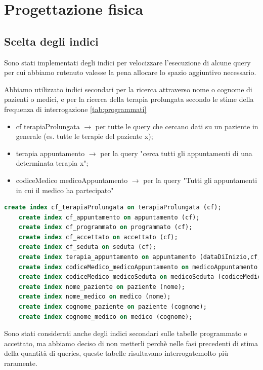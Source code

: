 \documentclass[11pt]{article}
\begin{document}
\section{Progettazione fisica}
\subsection{Scelta degli indici}
Sono stati implementati degli indici per velocizzare l'esecuzione di alcune query per cui abbiamo rutenuto valesse la pena allocare lo spazio aggiuntivo necessario.

Abbiamo utilizzato indici secondari per la ricerca attraverso nome o cognome di pazienti o medici, e per la ricerca della terapia prolungata secondo le stime della frequenza di interrogazione \ref{tab:programmati}

\begin{itemize}
    \item cf terapiaProlungata $\rightarrow$ per tutte le query che cercano dati su un paziente in generale (es. tutte le terapie del paziente x);
    \item terapia appuntamento $\rightarrow$ per la query "cerca tutti gli appuntamenti di una determinata terapia x";
    \item codiceMedico medicoAppuntamento $\rightarrow$ per la query "Tutti gli appuntamenti in cui il medico ha partecipato"
\end{itemize}
\begin{lstlisting}[language=SQL]
    create index cf_terapiaProlungata on terapiaProlungata (cf);
    create index cf_appuntamento on appuntamento (cf);
    create index cf_programmato on programmato (cf);
    create index cf_accettato on accettato (cf);
    create index cf_seduta on seduta (cf);
    create index terapia_appuntamento on appuntamento (dataDiInizio,cf,tipoDiSpecializzazione);
    create index codiceMedico_medicoAppuntamento on medicoAppuntamento (codiceMedico);
    create index codiceMedico_medicoSeduta on medicoSeduta (codiceMedico);
    create index nome_paziente on paziente (nome);
    create index nome_medico on medico (nome);
    create index cognome_paziente on paziente (cognome);
    create index cognome_medico on medico (cognome);
\end{lstlisting}
Sono stati considerati anche degli indici secondari sulle tabelle programmato e accettato, ma abbiamo deciso di non metterli perchè nelle fasi precedenti di stima della quantità di queries, queste tabelle risultavano interrogatemolto più raramente.
\end{document}
